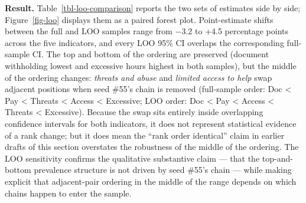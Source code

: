 \documentclass[
  12pt,
  letterpaper,
  DIV=11,
  numbers=noendperiod]{scrreprt}
\begin{document}
\textbf{Result.} Table~\ref{tbl-loo-comparison} reports the two sets of
estimates side by side; Figure~\ref{fig-loo} displays them as a paired
forest plot. Point-estimate shifts between the full and LOO samples
range from −3.2 to +4.5 percentage points across the five indicators,
and every LOO 95\% CI overlaps the corresponding full-sample CI. The top
and bottom of the ordering are preserved (document withholding lowest
and excessive hours highest in both samples), but the middle of the
ordering changes: \emph{threats and abuse} and \emph{limited access to
help} swap adjacent positions when seed \#55's chain is removed
(full-sample order: Doc \textless{} Pay \textless{} Threats \textless{}
Access \textless{} Excessive; LOO order: Doc \textless{} Pay \textless{}
Access \textless{} Threats \textless{} Excessive). Because the swap sits
entirely inside overlapping confidence intervals for both indicators, it
does not represent statistical evidence of a rank change; but it does
mean the ``rank order identical'' claim in earlier drafts of this
section overstates the robustness of the middle of the ordering. The LOO
sensitivity confirms the qualitative substantive claim --- that the
top-and-bottom prevalence structure is not driven by seed \#55's chain
--- while making explicit that adjacent-pair ordering in the middle of
the range depends on which chains happen to enter the sample.
\end{document}
